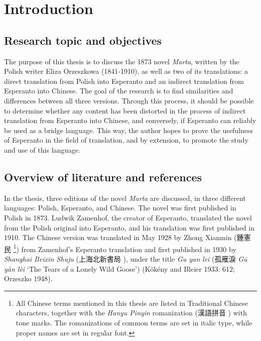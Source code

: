 \chapter{Introduction}

\section{Research topic and objectives}
The purpose of this thesis is to discuss the 1873 novel \textit{Marta}, written by the Polish writer Eliza Orzeszkowa (1841-1910), as well as two of its translations: a direct translation from Polish into Esperanto and an indirect translation from Esperanto into Chinese.
The goal of the research is to find similarities and differences between all three versions.
Through this process, it should be possible to determine whether any content has been distorted in the process of indirect translation from Esperanto into Chinese, and conversely, if Esperanto can reliably be used as a bridge language.
This way, the author hopes to prove the usefulness of Esperanto in the field of translation, and by extension, to promote the study and use of this language.

\section{Overview of literature and references}
In the thesis, three editions of the novel \textit{Marta} are discussed, in three different languages: Polish, Esperanto, and Chinese.
The novel was first published in Polish in 1873.
Ludwik Zamenhof, the creator of Esperanto, translated the novel from the Polish original into Esperanto, and his translation was first published in 1910.
The Chinese version was translated in May 1928 by Zhong Xianmin (鍾憲民 %
\footnote{All Chinese terms mentioned in this thesis are listed in Traditional Chinese characters, together with the \textit{Hanyu Pinyin} romanization (漢語拼音 ) with tone marks. The romanizations of common terms are set in italic type, while proper names are set in regular font.}) %
from Zamenhof's Esperanto translation and first published in 1930 by \textit{Shanghai Beixin Shuju} (上海北新書局 ), under the title \textit{Gu yan lei} (孤雁淚 \textit{Gū yàn lèi} `The Tears of a Lonely Wild Goose')
(Kökény and Bleier 1933: 612; Orzeszko 1948).

